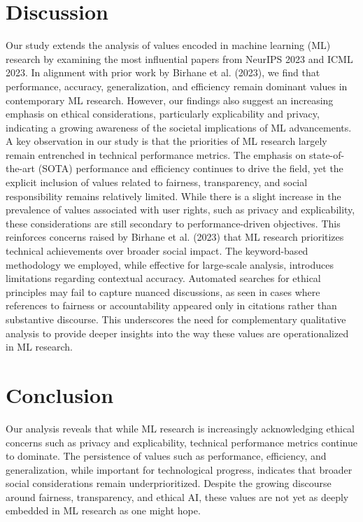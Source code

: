 \documentclass{article}
\begin{document}
\section{Discussion}
Our study extends the analysis of values encoded in machine learning (ML) research by examining the most influential papers from NeurIPS 2023 and ICML 2023. In alignment with prior work by Birhane et al. (2023), 
we find that performance, accuracy, generalization, and efficiency remain dominant values in contemporary ML research. However, our findings also suggest an increasing emphasis on ethical considerations, particularly 
explicability and privacy, indicating a growing awareness of the societal implications of ML advancements.
A key observation in our study is that the priorities of ML research largely remain entrenched in technical performance metrics. The emphasis on state-of-the-art (SOTA) performance and efficiency continues to drive the field, 
yet the explicit inclusion of values related to fairness, transparency, and social responsibility remains relatively limited. While there is a slight increase in the prevalence of values associated with user rights, such as 
privacy and explicability, these considerations are still secondary to performance-driven objectives. This reinforces concerns raised by Birhane et al. (2023) that ML research prioritizes technical achievements over broader 
social impact.
The keyword-based methodology we employed, while effective for large-scale analysis, introduces limitations regarding contextual accuracy. Automated searches for ethical principles may fail to capture nuanced discussions, 
as seen in cases where references to fairness or accountability appeared only in citations rather than substantive discourse. This underscores the need for complementary qualitative analysis to provide deeper insights into 
the way these values are operationalized in ML research.

\section{Conclusion}
Our analysis reveals that while ML research is increasingly acknowledging ethical concerns such as privacy and explicability, technical performance metrics continue to dominate. 
The persistence of values such as performance, efficiency, and generalization, while important for technological progress, indicates that broader social considerations remain underprioritized. 
Despite the growing discourse around fairness, transparency, and ethical AI, these values are not yet as deeply embedded in ML research as one might hope.
\end{document}
